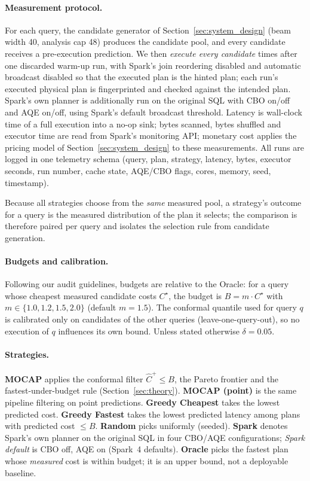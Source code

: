 \paragraph{Measurement protocol.}
For each query, the candidate generator of Section~\ref{sec:system_design}
(beam width 40, analysis cap 48) produces the candidate pool, and every
candidate receives a pre-execution prediction. We then \emph{execute every
candidate}  times after one discarded warm-up run, with
Spark's join reordering disabled and automatic broadcast disabled so that the
executed plan is the hinted plan; each run's executed physical plan is
fingerprinted and checked against the intended plan. Spark's own planner is
additionally run on the original SQL with CBO on/off and AQE on/off, using
Spark's default broadcast threshold. Latency is wall-clock time of a full
execution into a no-op sink; bytes scanned, bytes shuffled and executor time
are read from Spark's monitoring API; monetary cost applies the pricing model
of Section~\ref{sec:system_design} to these measurements. All runs are logged in
one telemetry schema (query, plan, strategy, latency, bytes, executor seconds,
run number, cache state, AQE/CBO flags, cores, memory, seed, timestamp).

Because all strategies choose from the \emph{same} measured pool, a strategy's
outcome for a query is the measured distribution of the plan it selects; the
comparison is therefore paired per query and isolates the selection rule from
candidate generation.

\paragraph{Budgets and calibration.}
Following our audit guidelines, budgets are relative to the Oracle: for a query
whose cheapest measured candidate costs $C^\star$, the budget is
$B = m \cdot C^\star$ with $m \in \{1.0, 1.2, 1.5, 2.0\}$ (default $m=1.5$).
The conformal quantile used for query $q$ is calibrated only on candidates of
the other queries (leave-one-query-out), so no execution of $q$ influences its
own bound. Unless stated otherwise $\delta = 0.05$.

\paragraph{Strategies.}
\textbf{MOCAP} applies the conformal filter $\hat C^{+} \le B$, the Pareto
frontier and the fastest-under-budget rule (Section~\ref{sec:theory}).
\textbf{MOCAP (point)} is the same pipeline filtering on point predictions.
\textbf{Greedy Cheapest} takes the lowest predicted cost.
\textbf{Greedy Fastest} takes the lowest predicted latency among plans with
predicted cost $\le B$. \textbf{Random} picks uniformly (seeded).
\textbf{Spark} denotes Spark's own planner on the original SQL in four CBO/AQE
configurations; \emph{Spark default} is CBO off, AQE on (Spark~4 defaults).
\textbf{Oracle} picks the fastest plan whose \emph{measured} cost is within
budget; it is an upper bound, not a deployable baseline.

